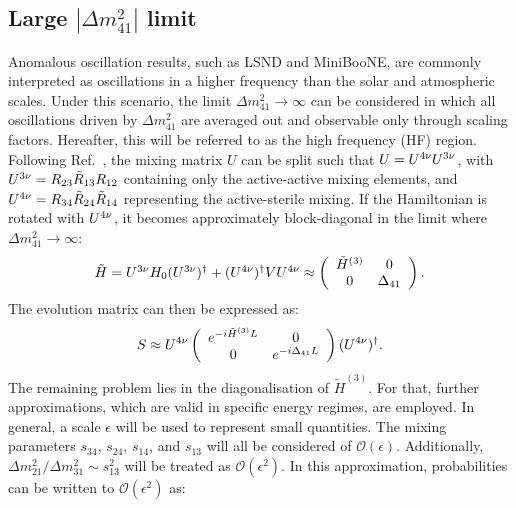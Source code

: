 \subsection{Large $|\Delta{m^2_{41}}|$ limit}

Anomalous oscillation results, such as LSND and MiniBooNE, are commonly interpreted as oscillations in a higher frequency than the solar and atmospheric scales. Under this scenario, the limit $\Delta{m^2_{41}}\rightarrow\infty$ can be considered in which all oscillations driven by $\Delta{m^2_{41}}$ are averaged out and observable only through scaling factors. Hereafter, this will be referred to as the high frequency (HF) region.
\\
Following Ref.~\cite{Maltoni:2007zf}, the mixing matrix $U$ can be split such that $U = U^{4\nu} U^{3\nu}$, with $U^{3\nu} = R_{23} \tilde{R}_{13} R_{12}$ containing only the active-active mixing elements, and $U^{4\nu} = R_{34} \tilde{R}_{24} \tilde{R}_{14}$ representing the active-sterile mixing. If the Hamiltonian is rotated with $U^{4\nu}$, it becomes approximately block-diagonal in the limit where $\Delta{m^2_{41}}\rightarrow\infty$:
\begin{equation}
\begin{array}{rl}
    \tilde{H} = U^{3\nu} H_0 (U^{3\nu})^\dagger + (U^{4\nu})^\dagger V U^{4\nu} 
    \approx \left(\begin{array}{cc}
        \tilde{H}^{(3)}  & 0 \\
        0  & \Delta_{41}
    \end{array}\right).
\end{array}
\end{equation}
The evolution matrix can then be expressed as:
\begin{equation}
    \label{eq:evol}
    S \approx U^{4\nu} \left(\begin{array}{cc}
        e^{-i\tilde{H}^{(3)}L} & 0 \\
        0 & e^{-i\Delta_{41}L}
    \end{array}\right) (U^{4\nu})^\dagger .
\end{equation}
The remaining problem lies in the diagonalisation of $\tilde{H}^{(3)}$. For that, further approximations, which are valid in specific energy regimes, are employed. In general, a scale $\epsilon$ will be used to represent small quantities. The mixing parameters $s_{34}$, $s_{24}$, $s_{14}$, and $s_{13}$ will all be considered of $\mathcal{O}(\epsilon)$. Additionally, $\Delta{m^2_{21}}/\Delta{m^2_{31}}\sim s_{13}^2$ will be treated as $\mathcal{O}(\epsilon^2)$. In this approximation, probabilities can be written to $\mathcal{O}(\epsilon^2)$ as:
